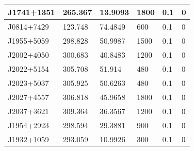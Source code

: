 \begin{table}
\begin{tabular}{|l|l|l|l|l|l|}
				J1741+1351
			 & 265.367 & 13.9093 & 1800 & 0.1 & 0 \\ \hline

				J0814+7429
			 & 123.748 & 74.4849 & 600 & 0.1 & 0 \\ \hline

				J1955+5059
			 & 298.828 & 50.9987 & 1500 & 0.1 & 0 \\ \hline

				J2002+4050
			 & 300.683 & 40.8483 & 1200 & 0.1 & 0 \\ \hline

				J2022+5154
			 & 305.708 & 51.914 & 480 & 0.1 & 0 \\ \hline

				J2023+5037
			 & 305.925 & 50.6263 & 480 & 0.1 & 0 \\ \hline

				J2027+4557
			 & 306.818 & 45.9658 & 1800 & 0.1 & 0 \\ \hline

				J2037+3621
			 & 309.364 & 36.3567 & 1200 & 0.1 & 0 \\ \hline

				J1954+2923
			 & 298.594 & 29.3881 & 900 & 0.1 & 0 \\ \hline

				J1932+1059
			 & 293.059 & 10.9926 & 300 & 0.1 & 0 \\ \hline
\end{tabular}
\end{table}
